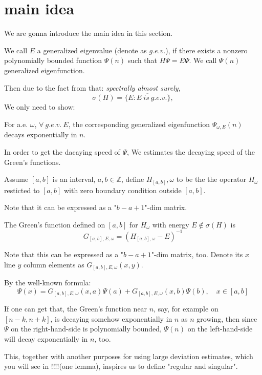 \section{main idea}
We are gonna introduce the main idea in this section.
\begin{definition}[$g.e.v.$]
    We call $E$ a generalized eigenvalue (denote as $g.e.v.$), if there exists a nonzero polynomially bounded function $\Psi(n)$ such that $H\Psi=E\Psi$. We call $\Psi(n)$ generalized eigenfunction.
\end{definition}
Then due to the fact from \cite{simon1982schrodinger} that:
\textit{spectrally almost surely,
\[
\sigma(H)=\overline{\{E:E~is~g.e.v.\}},
\]}
We only need to show:
\begin{thm}\label{thm1}
  For a.e. $\omega$, $\forall~g.e.v.~E$, the corresponding generalized eigenfunction $\Psi_{\omega,E}(n)$ decays exponentially in $n$.
\end{thm}

In order to get the dacaying speed of $\Psi$, We estimates the decaying speed of the Green's functions.
\begin{definition}
  Assume $[a,b]$ is an interval, $a,b\in\mathbb{Z}$, define $H_[a,b],\omega$ to be the the operator $H_\omega$ resticted to $[a,b]$ with zero boundary condition outside $[a,b]$.
\end{definition}
Note that it can be expressed as a "$b-a+1$"-dim matrix.
\begin{definition}
  The Green's function defined on $[a,b]$ for $H_\omega$ with energy $E\notin\sigma(H)$ is
  \[
    G_{[a,b],E,\omega}=(H_{[a,b],\omega}-E)^{-1}
  \]
\end{definition}
Note that this can be expressed as a "$b-a+1$"-dim matrix, too. Denote its $x$ line $y$ column elements as $G_{[a,b],E,\omega}(x,y)$.

By the well-known formula:
  \begin{equation}\label{possion}
    \Psi(x)=G_{[a,b],E,\omega}(x,a)\Psi(a)+G_{[a,b],E,\omega}(x,b)\Psi(b),\quad x\in[a,b]
  \end{equation}

If one can get that, the Green's function near $n$, say, for example on $[n-k,n+k]$, is decaying somehow exponentially in $n$ as $n$ growing, then since $\Psi$ on the  right-hand-side is polynomially bounded, $\Psi(n)$ on the left-hand-side will decay exponentially in $n$, too.

This, together with another purposes for using large deviation estimates, which you will see in !!!!(one lemma), inspires us to define "regular and singular".

